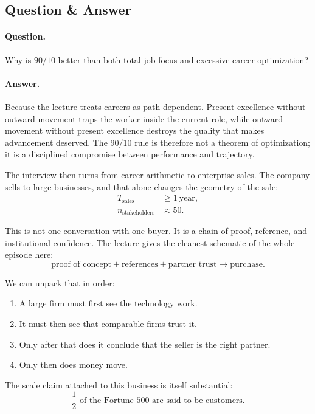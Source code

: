 \subsection{Question \& Answer}

\paragraph{Question.} Why is \(90/10\) better than both total job-focus and excessive career-optimization?

\paragraph{Answer.} Because the lecture treats careers as path-dependent. Present excellence without outward movement traps the worker inside the current role, while outward movement without present excellence destroys the quality that makes advancement deserved. The \(90/10\) rule is therefore not a theorem of optimization; it is a disciplined compromise between performance and trajectory.

The interview then turns from career arithmetic to enterprise sales. The company sells to large businesses, and that alone changes the geometry of the sale:
\begin{align}
T_{\mathrm{sales}} &\ge 1\ \text{year},\\
n_{\mathrm{stakeholders}} &\approx 50.
\end{align}

This is not one conversation with one buyer. It is a chain of proof, reference, and institutional confidence. The lecture gives the cleanest schematic of the whole episode here:
\begin{equation}
\text{proof of concept}+\text{references}+\text{partner trust}\to\text{purchase}.
\end{equation}

We can unpack that in order:
\begin{enumerate}
\item A large firm must first see the technology work.
\item It must then see that comparable firms trust it.
\item Only after that does it conclude that the seller is the right partner.
\item Only then does money move.
\end{enumerate}

The scale claim attached to this business is itself substantial:
\begin{equation}
\frac{1}{2}\text{ of the Fortune 500 are said to be customers.}
\end{equation}

